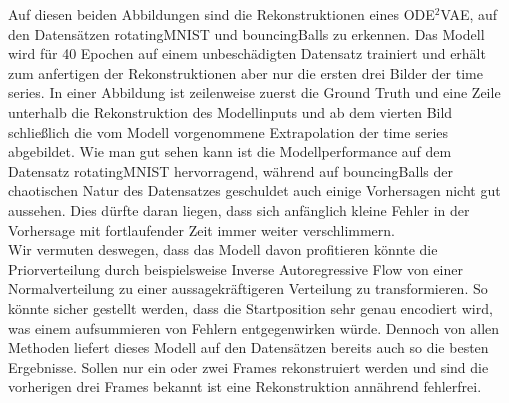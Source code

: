 \documentclass[12pt]{article}
\begin{document}
	Auf diesen beiden Abbildungen sind die Rekonstruktionen eines ODE$^2$VAE, auf den Datensätzen rotatingMNIST und bouncingBalls zu erkennen. Das Modell wird für 40 Epochen auf einem unbeschädigten Datensatz trainiert und erhält zum anfertigen der Rekonstruktionen aber nur die ersten drei Bilder der time series. 
	In einer Abbildung ist zeilenweise zuerst die Ground Truth und eine Zeile unterhalb die Rekonstruktion des Modellinputs und ab dem vierten Bild schließlich die vom Modell vorgenommene Extrapolation der time series abgebildet. Wie man gut sehen kann ist die Modellperformance auf dem Datensatz rotatingMNIST hervorragend, während auf  bouncingBalls der chaotischen Natur des Datensatzes geschuldet auch einige Vorhersagen nicht gut aussehen. Dies dürfte daran liegen, dass sich anfänglich kleine Fehler in der Vorhersage mit fortlaufender Zeit immer weiter verschlimmern. \\
	Wir vermuten deswegen, dass das Modell davon profitieren könnte die Priorverteilung durch beispielsweise Inverse Autoregressive Flow von einer Normalverteilung zu einer aussagekräftigeren Verteilung zu transformieren. So könnte sicher gestellt werden, dass die Startposition sehr genau encodiert wird, was einem aufsummieren von Fehlern entgegenwirken würde.
	Dennoch von allen Methoden liefert dieses Modell auf den Datensätzen bereits auch so die besten Ergebnisse. Sollen nur ein oder zwei Frames rekonstruiert werden und sind die vorherigen drei Frames bekannt ist eine Rekonstruktion annährend fehlerfrei. 
\end{document}
